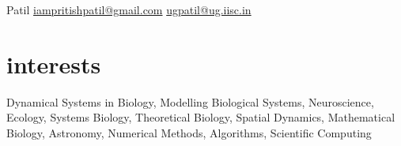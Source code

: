 \documentclass[11pt]{friggeri-cv}
\begin{document}
 {Patil} 
        {\href{mailto:iampritishpatil@gmail.com}{iampritishpatil@gmail.com}\quad  
    \href{mailto:ugpatil@ug.iisc.in}{ugpatil@ug.iisc.in}
}





\section{interests}

Dynamical Systems in Biology, Modelling Biological Systems, Neuroscience, Ecology, Systems Biology, Theoretical Biology, Spatial Dynamics, Mathematical Biology, Astronomy, Numerical Methods, Algorithms, Scientific Computing
\end{document}
